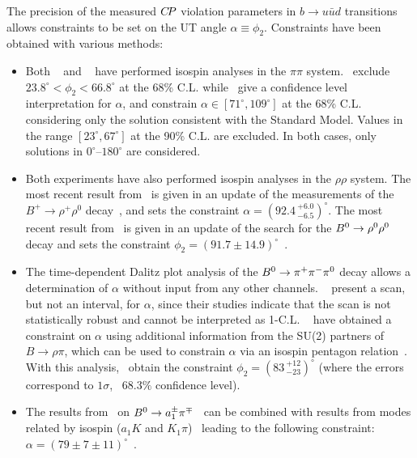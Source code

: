 The precision of the measured $C\!P$ violation parameters in
$b \to u\bar{u}d$ transitions allows 
constraints to be set on the UT angle $\alpha \equiv \phi_2$. 
Constraints have been obtained with various methods:
\begin{itemize}\setlength{\itemsep}{0.5ex}
\item 
  Both \babar~\cite{Lees:2012mma}
  and  \belle~\cite{Adachi:2013mae} have performed 
  isospin analyses in the $\pi\pi$ system.
  \belle\ exclude $23.8^\circ < \phi_2 < 66.8^\circ$ at the 68\%  C.L. while
  \babar\ give a confidence level interpretation for $\alpha$, and constrain
  $\alpha \in \left[ 71^\circ, 109^\circ \right]$ at the 68\%
  C.L. considering only the solution consistent with the Standard Model.
  Values in the range $\left[ 23^\circ, 67^\circ \right]$ at the 90\% C.L. are
  excluded.
  In both cases, only solutions in $0^\circ$--$180^\circ$ are considered.

\item
  Both experiments have also performed isospin analyses in the $\rho\rho$
  system. 
  The most recent result from \babar\ is given in an update of the
  measurements of the $B^+\to\rho^+\rho^0$ decay~\cite{Aubert:2009it}, and
  sets the constraint $\alpha = \left( 92.4 \,^{+6.0}_{-6.5}\right)^\circ$.
  The most recent result from \belle\ is given in an update of the
  search for the $B^0 \to \rho^0\rho^0$ decay and sets the constraint
  $\phi_2 = \left( 91.7 \pm 14.9 \right)^\circ$~\cite{:2008et}.

\item
  The time-dependent Dalitz plot analysis of the $B^0 \to \pi^+\pi^-\pi^0$
  decay allows a determination of $\alpha$ without input from any other 
  channels.
  \babar~\cite{Lees:2013nwa} present a scan, but not an interval, for $\alpha$, since
  their studies indicate that the scan is not statistically robust and cannot
  be interpreted as 1-C.L. 
  \belle~\cite{Kusaka:2007dv,:2007mj} have obtained a constraint on $\alpha$
  using additional information from the SU(2) partners of 
  $B \to \rho\pi$, which can be used to constrain $\alpha$
  via an isospin pentagon relation~\cite{Lipkin:1991st}. 
  With this analysis,
  \belle\ obtain the constraint $\phi_2 = (83 \, ^{+12}_{-23})^\circ$
  (where the errors correspond to $1\sigma$, \ie\ $68.3\%$ confidence level).

\item 
  The results from \babar\ on $B^0 \to a_1^\pm \pi^\mp$~\cite{Aubert:2006gb} can be
  combined with results from modes related by isospin ($a_1K$ and $K_1\pi$)~\cite{Gronau:2005kw}
  leading to the following constraint: 
  $\alpha = \left( 79 \pm 7 \pm 11 \right)^\circ$~\cite{:2009ii}.


\end{itemize}
